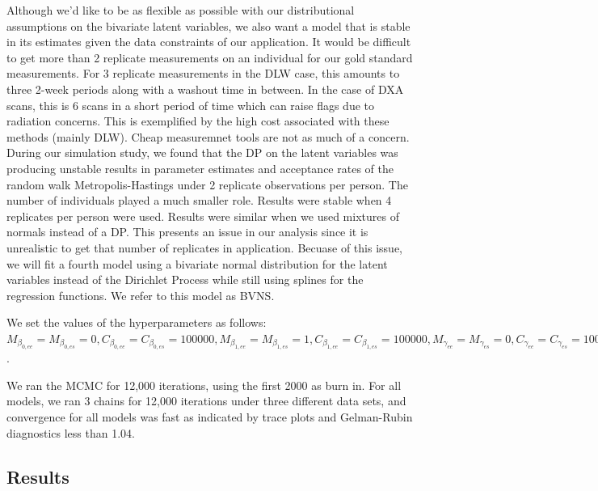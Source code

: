 \documentclass[11pt]{article}\usepackage[]{graphicx}\usepackage[]{color}
\begin{document}
Although we'd like to be as flexible as possible with our distributional assumptions on the bivariate latent variables, we also want a model that is stable in its estimates given the data constraints of our application. It would be difficult to get more than 2 replicate measurements on an individual for our gold standard measurements. For 3 replicate measurements in the DLW case, this amounts to three 2-week periods along with a washout time in between. In the case of DXA scans, this is 6 scans in a short period of time which can raise flags due to radiation concerns. This is exemplified by the high cost associated with these methods (mainly DLW). Cheap measuremnet tools are not as much of a concern. During our simulation study, we found that the DP on the latent variables was producing unstable results in parameter estimates and acceptance rates of the random walk Metropolis-Hastings under 2 replicate observations per person. The number of individuals played a much smaller role. Results were stable when 4 replicates per person were used. Results were similar when we used mixtures of normals instead of a DP. This presents an issue in our analysis since it is unrealistic to get that number of replicates in application. Becuase of this issue, we will fit a fourth model using a bivariate normal distribution for the latent variables instead of the Dirichlet Process while still using splines for the regression functions. We refer to this model as BVNS. 

We set the values of the hyperparameters as follows: $M_{\beta_{0,ee}} = M_{\beta_{0,es}} = 0, C_{\beta_{0,ee}} = C_{\beta_{0,es}} = 100000, M_{\beta_{1,ee}} = M_{\beta_{1,es}} = 1, C_{\beta_{1,ee}} = C_{\beta_{1,es}} = 100000, M_{\gamma_{ee}} = M_{\gamma_{es}} = 0, C_{\gamma_{ee}} = C_{\gamma_{es}} = 100000, a_{yee} = a_{yes} = a_{wee} = a_{wes} = b_{yee} = b_{yes} = b_{wee} = b_{wes} = 0.1, \psi = I_{2\times 2}, d = 3, M_{\mu} = (2400,0), C_{\mu} = diag(100000,100000), \lambda_{ee} = \lambda_{es} = 1$.

We ran the MCMC for 12,000 iterations, using the first 2000 as burn in. For all models, we ran 3 chains for 12,000 iterations under three different data sets, and convergence for all models was fast as indicated by trace plots and Gelman-Rubin diagnostics less than 1.04.


\subsection{Results}
\end{document}
